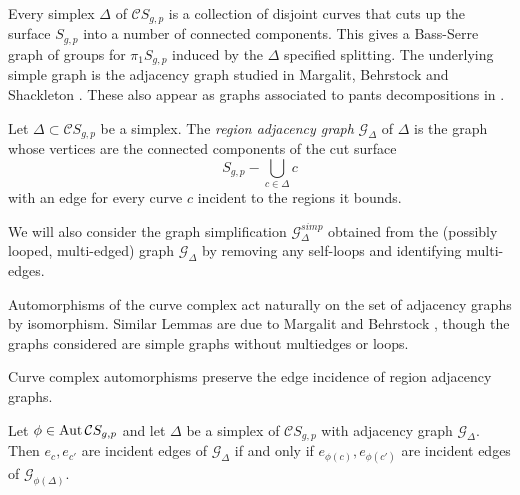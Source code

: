 
\thmaddpunc*



\begin{remark}
Every simplex $\Delta$ of $\mathcal C S_{g,p}$
is a collection of disjoint curves that cuts up the surface $S_{g,p}$ into
a number of connected components.
This gives a
Bass-Serre
graph of groups
for $\pi_1 S_{g,p}$
induced by the $\Delta$ specified splitting.
The underlying simple graph
is the adjacency graph studied in
Margalit, Behrstock \cite{MR2239449}
and Shackleton \cite{MR2318453}.
These also appear as graphs associated to
pants decompositions in \cite{MR579573}.
\end{remark}

\begin{definition}
Let $\Delta \subset \mathcal C S_{g,p}$ be a simplex.
The \emph{region adjacency graph} $\mathcal G_\Delta$
of $\Delta$
is the graph whose
vertices are the connected components of
the cut surface
$$
S_{g,p} - \bigcup_{c \in \Delta} c
$$
with an edge for
every curve $c$ incident to the regions it bounds.

We will also consider the graph simplification
$\mathcal G^{simp}_{\Delta}$ obtained
from the (possibly looped, multi-edged) graph
$\mathcal G_\Delta$ by
removing any self-loops and
identifying multi-edges.
\label{def:graphadj}
\end{definition}

Automorphisms
of the curve complex act naturally on the
set of adjacency graphs by isomorphism.
Similar Lemmas are due to Margalit and Behrstock \cite{MR2239449},
though the graphs considered are simple graphs without multiedges or loops.

\begin{lemma}
  Curve complex automorphisms preserve the
  edge incidence of region adjacency graphs.

  Let $\phi \in \operatorname{Aut} \mathcal C S_{g,p}$
  and let $\Delta$ be a simplex of $\mathcal C S_{g,p}$
  with adjacency graph $\mathcal G_\Delta$.
  Then $e_c,e_{c'}$ are incident edges of $\mathcal G_\Delta$
  if and only if $e_{\phi(c)},e_{\phi(c')}$
  are incident edges of $\mathcal G_{\phi(\Delta)}$.
  \label{lemma:adjgraph}
\end{lemma}

